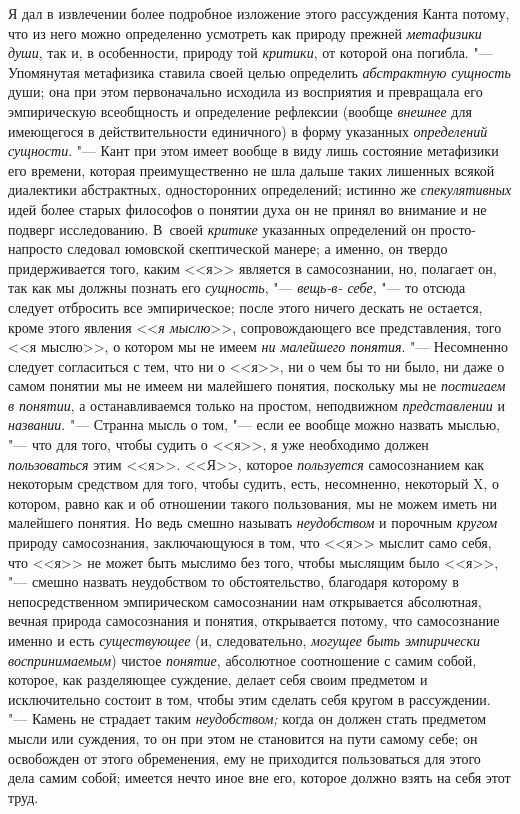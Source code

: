 Я дал в извлечении более подробное изложение этого рассуждения
Канта потому, что из него можно определенно усмотреть как природу прежней
{\em метафизики души},
так и, в особенности, природу той
{\em критики}, от которой
она погибла. "--- Упомянутая метафизика ставила своей целью
определить {\em абстрактную сущность}
души; она при этом первоначально исходила из восприятия и
превращала его эмпирическую всеобщность и определение рефлексии (вообще
{\em внешнее} для
имеющегося в действительности единичного) в форму указанных
{\em определений сущности}. "---
Кант при этом имеет вообще в виду лишь состояние метафизики
его времени, которая преимущественно не шла дальше таких лишенных всякой
диалектики абстрактных, односторонних определений; истинно же
{\em спекулятивных} идей
более старых философов о понятии духа он не принял во внимание и не подверг
исследованию. В~своей {\em критике}
указанных определений он просто-напросто следовал юмовской
скептической манере; а именно, он твердо придерживается того, каким <<я>>
является в самосознании, но, полагает он, так как мы должны познать его
{\em сущность}, "---
{\em вещь-в- себе}, "--- то
отсюда следует отбросить все эмпирическое; после этого ничего дескать не
остается, кроме этого явления
<<{\em я мыслю}>>,
сопровождающего все представления, того <<я мыслю>>, о котором
мы не имеем {\em ни малейшего понятия}.
"--- Несомненно следует согласиться с тем, что ни о <<я>>, ни о
чем бы то ни было, ни даже о самом понятии мы не имеем ни малейшего
понятия, поскольку мы не {\em постигаем
в понятии}, а останавливаемся только на простом, неподвижном
{\em представлении} и
{\em названии}. "--- Странна
мысль о том, "--- если ее вообще можно назвать мыслью, "---
что для того, чтобы судить о <<я>>, я уже необходимо должен
{\em пользоваться} этим
<<я>>. <<Я>>, которое {\em пользуется}
самосознанием как некоторым средством для того, чтобы судить,
есть, несомненно, некоторый X, о котором, равно как и об отношении такого
пользования, мы не можем иметь ни малейшего понятия. Но ведь смешно
называть {\em неудобством}
и порочным
{\em кругом}
природу самосознания, заключающуюся в том, что <<я>> мыслит
само себя, что <<я>> не может быть мыслимо без того, чтобы мыслящим было
<<я>>, "--- смешно назвать неудобством то обстоятельство,
благодаря которому в непосредственном эмпирическом
самосознании нам открывается абсолютная, вечная природа самосознания и
понятия, открывается потому, что самосознание именно и есть
{\em существующее} (и,
следовательно, {\em могущее быть
эмпирически воспринимаемым}) чистое
{\em понятие}, абсолютное
соотношение с самим собой, которое, как разделяющее суждение, делает себя
своим предметом и исключительно состоит в том, чтобы этим сделать себя
кругом в рассуждении. "--- Камень не страдает таким
{\em неудобством;} когда
он должен стать предметом мысли или суждения, то он при этом не становится
на пути самому себе; он освобожден от этого обременения, ему не приходится
пользоваться для этого дела самим собой; имеется нечто иное вне его,
которое должно взять на себя этот труд.


